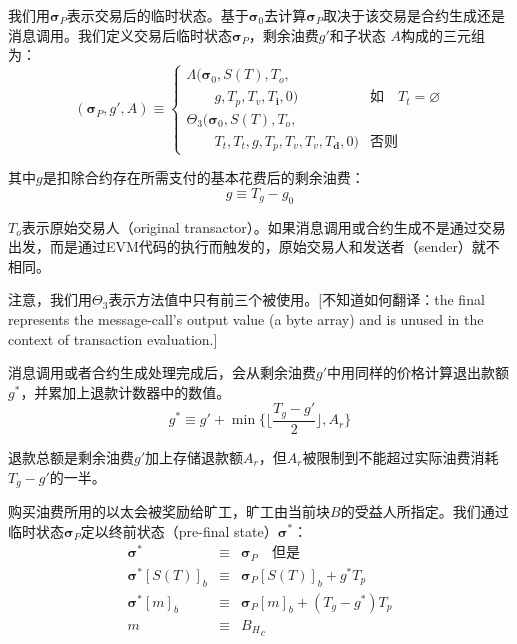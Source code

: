 \documentclass[UTF8,nofonts]{ctexart}
\begin{document}
\begin{multicols}{2}
我们用$\boldsymbol{\sigma}_P$表示交易后的临时状态。基于$\boldsymbol{\sigma}_0$去计算$\boldsymbol{\sigma}_P$取决于该交易是合约生成还是消息调用。我们定义交易后临时状态$\boldsymbol{\sigma}_P$，剩余油费$g'$和子状态 $A$构成的三元组为：
\begin{equation}
(\boldsymbol{\sigma}_P, g', A) \equiv \begin{cases}
\Lambda(\boldsymbol{\sigma}_0, S(T), T_o, &\\ \quad\quad g, T_p, T_v, T_\mathbf{i}, 0) & \text{如} \quad T_t = \varnothing \\
\Theta_{3}(\boldsymbol{\sigma}_0, S(T), T_o, &\\ \quad\quad T_t, T_t, g, T_p, T_v, T_v, T_\mathbf{d}, 0) & \text{否则}
\end{cases}
\end{equation}

其中$g$是扣除合约存在所需支付的基本花费后的剩余油费：
\begin{equation}
g \equiv T_g - g_0
\end{equation}

$T_o$表示原始交易人（original transactor）。如果消息调用或合约生成不是通过交易出发，而是通过EVM代码的执行而触发的，原始交易人和发送者（sender）就不相同。

注意，我们用$\Theta_{3}$表示方法值中只有前三个被使用。[不知道如何翻译：the final represents the message-call's output value (a byte array) and is unused in the context of transaction evaluation.]

消息调用或者合约生成处理完成后，会从剩余油费$g'$中用同样的价格计算退出款额$g^*$，并累加上退款计数器中的数值。
\begin{equation}
g^* \equiv g' + \min \{ \Big\lfloor \dfrac{T_g - g'}{2} \Big\rfloor, A_r \}
\end{equation}

退款总额是剩余油费$g'$加上存储退款额$A_r$，但$A_r$被限制到不能超过实际油费消耗$T_g - g'$的一半。

购买油费所用的以太会被奖励给旷工，旷工由当前块$B$的受益人所指定。我们通过临时状态$\boldsymbol{\sigma}_P$定以终前状态（pre-final state）$\boldsymbol{\sigma}^*$：
\begin{eqnarray}
\boldsymbol{\sigma}^* & \equiv & \boldsymbol{\sigma}_P \quad \text{但是} \\
\boldsymbol{\sigma}^*[S(T)]_b & \equiv & \boldsymbol{\sigma}_P[S(T)]_b + g^* T_p \\
\boldsymbol{\sigma}^*[m]_b & \equiv & \boldsymbol{\sigma}_P[m]_b + (T_g - g^*) T_p \\
m & \equiv & {B_H}_c
\end{eqnarray}


\end{multicols}
\end{document}
